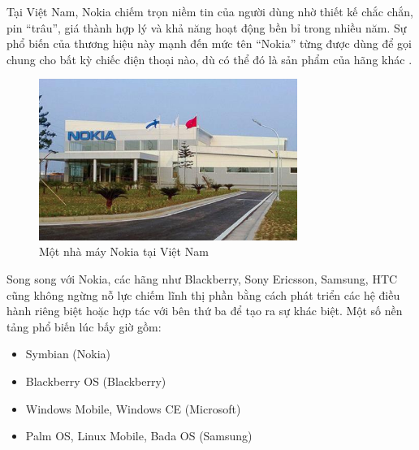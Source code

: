   \begin{flushleft}
  \hspace*{0.8cm}Tại Việt Nam, Nokia chiếm trọn niềm tin của người dùng nhờ thiết kế chắc chắn, pin “trâu”, giá thành hợp lý và khả năng hoạt động bền bỉ trong nhiều năm. Sự phổ biến của thương hiệu này mạnh đến mức tên “Nokia” từng được dùng để gọi chung cho bất kỳ chiếc điện thoại nào, dù có thể đó là sản phẩm của hãng khác \cite{nokia-vietnam-popularity}.
  \end{flushleft}

\begin{figure}[h]
  \centering
  \includegraphics[width=0.75\textwidth]{images/nokia-4d687.jpg}
  \caption{Một nhà máy Nokia tại Việt Nam}
  \label{fig:fig8}
\end{figure}

  \begin{flushleft}
  \hspace*{0.8cm}Song song với Nokia, các hãng như Blackberry, Sony Ericsson, Samsung, HTC cũng không ngừng nỗ lực chiếm lĩnh thị phần bằng cách phát triển các hệ điều hành riêng biệt hoặc hợp tác với bên thứ ba để tạo ra sự khác biệt. Một số nền tảng phổ biến lúc bấy giờ gồm:
  \begin{itemize}
  \item Symbian (Nokia)
  \item Blackberry OS (Blackberry)
  \item Windows Mobile, Windows CE (Microsoft)
  \item Palm OS, Linux Mobile, Bada OS (Samsung)
  \end{itemize}
  \end{flushleft}
  
